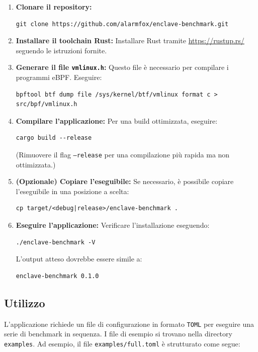 \documentclass{article}
\begin{document}
\begin{enumerate}
  \item \textbf{Clonare il repository:}
  \begin{verbatim}
git clone https://github.com/alarmfox/enclave-benchmark.git
  \end{verbatim}

  \item \textbf{Installare il toolchain Rust:} Installare Rust tramite \url{https://rustup.rs/} seguendo le istruzioni fornite.

  \item \textbf{Generare il file \texttt{vmlinux.h}:} Questo file è necessario per compilare i programmi eBPF. Eseguire:
  \begin{verbatim}
bpftool btf dump file /sys/kernel/btf/vmlinux format c > src/bpf/vmlinux.h
  \end{verbatim}

  \item \textbf{Compilare l'applicazione:} Per una build ottimizzata, eseguire:
  \begin{verbatim}
cargo build --release
  \end{verbatim}
  (Rimuovere il flag \texttt{--release} per una compilazione più rapida ma non ottimizzata.)

  \item \textbf{(Opzionale) Copiare l'eseguibile:} Se necessario, è possibile copiare l'eseguibile in una posizione a scelta:
  \begin{verbatim}
cp target/<debug|release>/enclave-benchmark .
  \end{verbatim}

  \item \textbf{Eseguire l'applicazione:} Verificare l'installazione eseguendo:
  \begin{verbatim}
./enclave-benchmark -V
  \end{verbatim}
  L'output atteso dovrebbe essere simile a:
  \begin{verbatim}
enclave-benchmark 0.1.0
  \end{verbatim}
\end{enumerate}

\subsection{Utilizzo}
L'applicazione richiede un file di configurazione in formato \texttt{TOML} per eseguire una serie di benchmark in sequenza. I file di esempio si trovano nella directory \texttt{examples}. Ad esempio, il file \texttt{examples/full.toml} è strutturato come segue:
\end{document}
